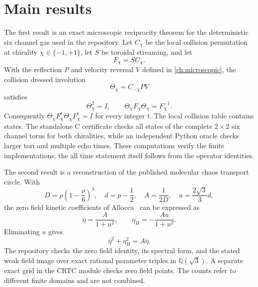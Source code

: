 \section{Main results}
The first result is an exact microscopic reciprocity theorem for the deterministic six channel gas used in the repository. Let $C_\chi$ be the local collision permutation at chirality $\chi\in\{-1,+1\}$, let $S$ be toroidal streaming, and let
\begin{equation}
 F_\chi=S C_\chi.
 \label{eq:intro_f}
\end{equation}
With the reflection $P$ and velocity reversal $V$ defined in \cref{ch:microscopic}, the collision dressed involution
\begin{equation}
 \Theta_\chi=C_{-\chi}PV
 \label{eq:intro_theta}
\end{equation}
satisfies
\begin{equation}
 \Theta_\chi^2=I,
 \qquad
 \Theta_\chi F_\chi\Theta_\chi=F_\chi^{-1}.
 \label{eq:intro_reversor}
\end{equation}
Consequently $\Theta_\chi F_\chi^t\Theta_\chi F_\chi^t=I$ for every integer $t$. The local collision table contains \HXLocalStates{} states. The standalone C certificate checks all \HXGlobalStates{} states of the complete $2\times2$ six channel torus for both chiralities, while an independent Python oracle checks larger tori and multiple echo times. These computations verify the finite implementations; the all time statement itself follows from the operator identities.

The second result is a reconstruction of the published molecular chaos transport circle. With
\begin{equation}
 D=\rho\left(1-\frac{\rho}{6}\right)^3,
 \quad
 d=p-\frac12,
 \quad
 A=\frac{1}{2D},
 \quad
 u=\frac{2\sqrt3}{3}d,
 \label{eq:intro_fhp_defs}
\end{equation}
the zero field kinetic coefficients of Allocca \etal\ can be expressed as
\begin{equation}
 \bar\eta=\frac{A}{1+u^2},
 \qquad
 \eta_H=-\frac{Au}{1+u^2}.
 \label{eq:intro_fhp_coeffs}
\end{equation}
Eliminating $u$ gives
\begin{equation}
 \bar\eta^2+\eta_H^2=A\bar\eta.
 \label{eq:intro_boltz_circle}
\end{equation}
The repository checks the zero field identity, its spectral form, and the stated weak field image over \HXTransportGridPoints{} exact rational parameter triples in $\mathbb{Q}(\sqrt3)$. A separate exact grid in the CRTC module checks \CRTCBoltzmannGridPoints{} zero field points. The counts refer to different finite domains and are not combined.

